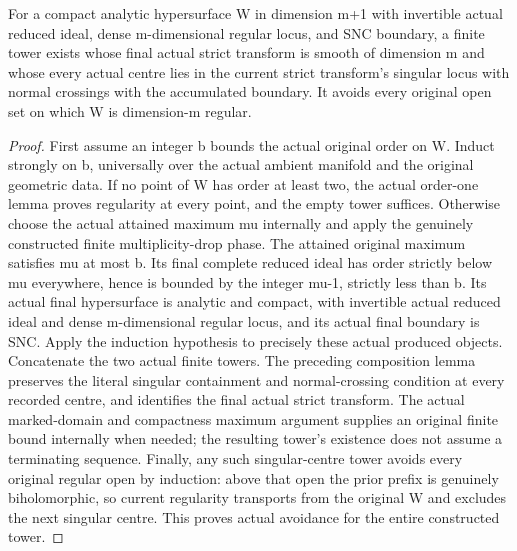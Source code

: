 \begin{theorem}
\label{hir:finite-reduced-multiplicity-restarts}
\leanok
For a compact analytic hypersurface W in dimension m+1 with invertible
actual reduced ideal, dense m-dimensional regular locus, and SNC boundary,
a finite tower exists whose final actual strict transform is smooth of
dimension m and whose every actual centre lies in the current strict
transform's singular locus with normal crossings with the accumulated
boundary. It avoids every original open set on which W is dimension-m
regular.
\end{theorem}
\begin{proof}
First assume an integer b bounds the actual original order on W. Induct
strongly on b, universally over the actual ambient manifold and the
original geometric data. If no point of W has order at least two, the
actual order-one lemma proves regularity at every point, and the empty
tower suffices. Otherwise choose the actual attained maximum mu internally
and apply the genuinely constructed finite multiplicity-drop phase. The
attained original maximum satisfies mu at most b. Its final complete
reduced ideal has order strictly below mu everywhere, hence is bounded
by the integer mu-1, strictly less than b. Its actual final hypersurface
is analytic and compact, with invertible actual reduced ideal and dense
m-dimensional regular locus, and its actual final boundary is SNC.
Apply the induction hypothesis to precisely these actual produced objects.
Concatenate the two actual finite towers. The preceding composition lemma
preserves the literal singular containment and normal-crossing condition
at every recorded centre, and identifies the final actual strict transform.
The actual marked-domain and compactness maximum argument supplies an
original finite bound internally when needed; the resulting tower's
existence does not assume a terminating sequence. Finally, any such
singular-centre tower avoids every original regular open by induction:
above that open the prior prefix is genuinely biholomorphic, so current
regularity transports from the original W and excludes the next singular
centre. This proves actual avoidance for the entire constructed tower.
\end{proof}

